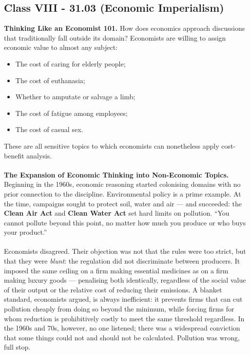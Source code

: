 \documentclass[a4paper,12pt]{article}
\begin{document}
\subsection*{Class VIII - 31.03 (Economic Imperialism)}
\noindent \textbf{Thinking Like an Economist 101.} How does economics approach discussions that traditionally fall outside its domain? Economists are willing to assign economic value to almost any subject:
\begin{itemize}
	\item The cost of caring for elderly people;
	\item The cost of euthanasia;
	\item Whether to amputate or salvage a limb;
	\item The cost of fatigue among employees;
	\item The cost of casual sex.
\end{itemize}
\noindent These are all sensitive topics to which economists can nonetheless apply cost-benefit analysis. \\
\\
\noindent \textbf{The Expansion of Economic Thinking into Non-Economic Topics.} \\
\noindent Beginning in the 1960s, economic reasoning started colonising domains with no prior connection to the discipline. Environmental policy is a prime example. At the time, campaigns sought to protect soil, water and air --- and succeeded: the \textbf{Clean Air Act} and \textbf{Clean Water Act} set hard limits on pollution. ``You cannot pollute beyond this point, no matter how much you produce or who buys your product.'' \\
\\
\noindent Economists disagreed. Their objection was not that the rules were too strict, but that they were \emph{blunt}: the regulation did not discriminate between producers. It imposed the same ceiling on a firm making essential medicines as on a firm making luxury goods --- penalising both identically, regardless of the social value of their output or the relative cost of reducing their emissions. A blanket standard, economists argued, is always inefficient: it prevents firms that can cut pollution cheaply from doing so beyond the minimum, while forcing firms for whom reduction is prohibitively costly to meet the same threshold regardless. In the 1960s and 70s, however, no one listened; there was a widespread conviction that some things could not and should not be calculated. Pollution was wrong, full stop. \\
\end{document}
